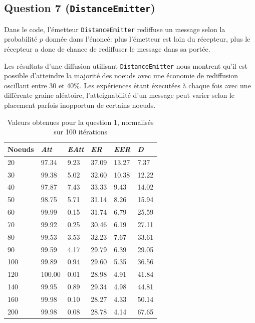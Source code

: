\documentclass[a4paper]{article}
\begin{document}
\pagebreak

\subsection{Question 7 (\texttt{DistanceEmitter})}

\begin{minipage}{0.5\textwidth}
Dans le code, l'émetteur \texttt{DistanceEmitter} rediffuse un message
selon la probabilité $p$ donnée dans l'énoncé: plus l'émetteur est
loin du récepteur, plus le récepteur a donc de chance de rediffuser le
message dans sa portée.

Les résultats d'une diffusion utilisant \texttt{DistanceEmitter} nous
montrent qu'il est possible d'atteindre la majorité des noeuds avec
une économie de rediffusion oscillant entre 30 et 40\%. Les
expériences étant éxecutées à chaque fois avec une différente graine
aléatoire, l'atteignabilité d'un message peut varier selon le
placement parfois inopportun de certains noeuds.
\end{minipage}
\hfill
\begin{minipage}{0.4\textwidth}
  \begin{table}[H]
    \begin{tabular}{|l|l|l|l|l|l|}
      \hline
Noeuds &\textsl{Att} & \textsl{EAtt} & \textsl{ER} & \textsl{EER} &
\textsl{D} \\ \hline
20 & 97.34 & 9.23 & 37.09 & 13.27 & 7.37 \\ \hline
30 & 99.38 & 5.02 & 32.60 & 10.38 & 12.22 \\ \hline
40 & 97.87 & 7.43 & 33.33 & 9.43 & 14.02 \\ \hline
50 & 98.75 & 5.71 & 31.14 & 8.26 & 15.94 \\ \hline
60 & 99.99 & 0.15 & 31.74 & 6.79 & 25.59 \\ \hline
70 & 99.92 & 0.25 & 30.46 & 6.19 & 27.11 \\ \hline
80 & 99.53 & 3.53 & 32.23 & 7.67 & 33.61 \\ \hline
90 & 99.59 & 4.17 & 29.79 & 6.39 & 29.05 \\ \hline
100 & 99.89 & 0.94 & 29.60 & 5.35 & 36.56 \\ \hline
120 & 100.00 & 0.01 & 28.98 & 4.91 & 41.84 \\ \hline
140 & 99.95 & 0.89 & 29.34 & 4.98 & 44.81 \\ \hline
160 & 99.98 & 0.10 & 28.27 & 4.33 & 50.14 \\ \hline
200 & 99.98 & 0.08 & 28.78 & 4.14 & 67.65 \\ \hline
    \end{tabular}
    \caption{Valeurs obtenues pour la question 1, normalisés sur 100 itérations}
  \end{table}

\end{minipage}
\end{document}

